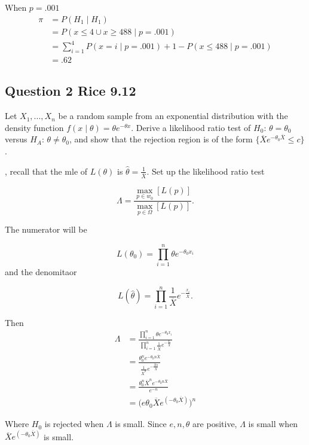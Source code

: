 \documentclass{tufte-book}
\theoremstyle{mytheoremstyle}
\theoremstyle{mylemstyle}
\theoremstyle{mydefstyle}
\begin{document}
\begin{enumerate}
When $p=.001$
\begin{align*}
\pi &= P(H_1 \mid H_1)\\
&= P(x \leq 4 \cup x \geq 488 \mid p=.001)\\
&= \sum_{i=1}^4P(x=i \mid p=.001) + 1 - P(x \leq 488 \mid p=.001)\\
&= .62
\end{align*}
\end{enumerate}


\subsection{Question 2 Rice 9.12}

Let $X_1,...,X_n$ be a random sample from an exponential distribution with the density function $f(x\mid \theta)= \theta e^{-\theta x}$.  Derive a likelihood ratio test of $H_0$: $\theta = \theta_0$ versus $H_A$: $\theta \neq \theta_0$, and show that the rejection region is of the form $\{\overline{X}e^{-\theta_0\overline{X}} \leq c \}$.

,  recall that the mle of $L(\theta)$ is $\hat{\theta}=\frac{1}{\overline{X}}$.  Set up the likelihood ratio test

\[ \Lambda = \frac{\max_{p \in w_0}[L(p)]}{\max_{p \in \Omega}[L(p)]}. \]

The numerator will be

\[ L(\theta_0) = \prod_{i=1}^n \theta e^{-\theta_0 x_i} \]
and the denomitaor

\[ L(\hat{\theta}) = \prod_{i=1}^n \frac{1}{\overline{X}} e^{-\frac{x_i}{\overline{X}}}. \]

Then
\begin{align*}
\Lambda &= \frac{\prod_{i=1}^n \theta e^{-\theta_0 x_i}}{\prod_{i=1}^n \frac{1}{\overline{X}} e^{-\frac{x_i}{\overline{X}}}}\\
&= \frac{\theta_0^n e^{-\theta_0 n\overline{X}}}{\frac{1}{\overline{X}^n}e^{-\frac{\overline{X}n}{\overline{X}}}}\\
&= \frac{\theta_0^n \overline{X}^n e^{-\theta_0 n\overline{X}}}{e^{-n}}\\
&= \big(e \theta_0 \overline{X} e^{(-\theta_0 \overline{X})}\big)^n
\end{align*}

Where $H_0$ is rejected when $\Lambda$ is small.  Since $e, n, \theta$ are positive, $\Lambda$ is small when $\overline{X} e^{(-\theta_0 \overline{X})}$ is small.
\end{document}

